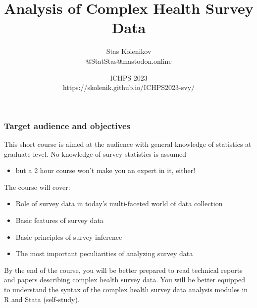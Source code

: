 \documentclass[handout]{beamer}
\begin{document}
\title{\textbf{Analysis of Complex Health Survey Data}}
\author[Stas Kolenikov]{Stas Kolenikov \\ @StatStas@mastodon.online}
\date[ICHPS 2023]{ICHPS 2023
 \medskip \\ https://skolenik.github.io/ICHPS2023-svy/ }




\begin{frame}
    \titlepage
\end{frame}

\begin{frame}\frametitle{Target audience and objectives}

This short course is aimed at the audience with general knowledge of statistics
at graduate level. No knowledge of survey statistics is assumed
\begin{itemize}
    \item but a 2 hour course won't make you an expert in it, either!
\end{itemize}

The course will cover:
\begin{itemize}
    \item Role of survey data in today's multi-faceted world of data collection
    \item Basic features of survey data
    \item Basic principles of survey inference
    \item The most important peculiarities of analyzing survey data
\end{itemize}

By the end of the course, you will be better prepared to read technical reports
and papers describing complex health survey data. You will be better equipped to
understand the syntax of the complex health survey data analysis modules
in R and Stata (self-study).

\end{frame}
\end{document}
